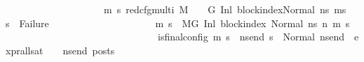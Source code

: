 \begin{isabellebody}
\ \ \ \ \ \ \ \ \ \ \ \ \ \ \ \ \ \ \ \ {\isacharparenleft}{\kern0pt}{\isasymforall}m{\isacharprime}{\kern0pt}\ s{\isacharprime}{\kern0pt}{\isachardot}{\kern0pt}\ {\isacharparenleft}{\kern0pt}red{\isacharunderscore}{\kern0pt}cfg{\isacharunderscore}{\kern0pt}multi\ M\ {\isasymLambda}\ {\isasymGamma}\ {\isasymOmega}\ G\ {\isacharparenleft}{\kern0pt}{\isacharparenleft}{\kern0pt}Inl\ block{\isacharunderscore}{\kern0pt}index{\isacharparenright}{\kern0pt}{\isacharcomma}{\kern0pt}{\isacharparenleft}{\kern0pt}Normal\ ns{}{\isacharparenright}{\kern0pt}{\isacharparenright}{\kern0pt}\ {\isacharparenleft}{\kern0pt}m{\isacharprime}{\kern0pt}{\isacharcomma}{\kern0pt}s{\isacharprime}{\kern0pt}{\isacharparenright}{\kern0pt}{\isacharparenright}{\kern0pt}\ {\isasymlongrightarrow}\ {\isacharparenleft}{\kern0pt}s{\isacharprime}{\kern0pt}\ {\isasymnoteq}\ Failure{\isacharparenright}{\kern0pt}{\isacharparenright}{\kern0pt}\ {\isasymLongrightarrow}\isanewline
\ \ \ \ \ \ \ \ \ \ \ \ \ \ \ \ \ \ \ \ {\isacharparenleft}{\kern0pt}{\isasymforall}m{\isacharprime}{\kern0pt}\ s{\isacharprime}{\kern0pt}{\isachardot}{\kern0pt}\ \ {\isacharparenleft}{\kern0pt}M{\isacharcomma}{\kern0pt}{\isasymLambda}{\isacharcomma}{\kern0pt}{\isasymGamma}{\isacharcomma}{\kern0pt}{\isasymOmega}{\isacharcomma}{\kern0pt}G\ {\isasymturnstile}{\isacharparenleft}{\kern0pt}Inl\ block{\isacharunderscore}{\kern0pt}index{\isacharcomma}{\kern0pt}\ Normal\ ns{}{\isacharparenright}{\kern0pt}\ {\isacharminus}{\kern0pt}n{\isasymrightarrow}{\isacharasterisk}{\kern0pt}\ {\isacharparenleft}{\kern0pt}m{\isacharprime}{\kern0pt}{\isacharcomma}{\kern0pt}\ s{\isacharprime}{\kern0pt}{\isacharparenright}{\kern0pt}{\isacharparenright}{\kern0pt}\ {\isasymlongrightarrow}\isanewline
\ \ \ \ \ \ \ \ \ \ \ \ \ \ \ \ \ \ \ \ \ \ \ \ \ \ \ \ \ \ \ is{\isacharunderscore}{\kern0pt}final{\isacharunderscore}{\kern0pt}config\ {\isacharparenleft}{\kern0pt}m{\isacharprime}{\kern0pt}{\isacharcomma}{\kern0pt}\ s{\isacharprime}{\kern0pt}{\isacharparenright}{\kern0pt}\ {\isasymlongrightarrow}\ {\isacharparenleft}{\kern0pt}{\isasymforall}ns{\isacharunderscore}{\kern0pt}end{\isachardot}{\kern0pt}\ s{\isacharprime}{\kern0pt}\ {\isacharequal}{\kern0pt}\ Normal\ ns{\isacharunderscore}{\kern0pt}end\ {\isasymlongrightarrow}\ {\isacharparenleft}{\kern0pt}expr{\isacharunderscore}{\kern0pt}all{\isacharunderscore}{\kern0pt}sat\ {\isasymLambda}\ {\isasymGamma}\ {\isasymOmega}\ ns{\isacharunderscore}{\kern0pt}end{\isacharparenright}{\kern0pt}\ posts{\isacharparenright}{\kern0pt}{\isacharparenright}{\kern0pt}\ {\isasymLongrightarrow}\isanewline

\end{isabellebody}
